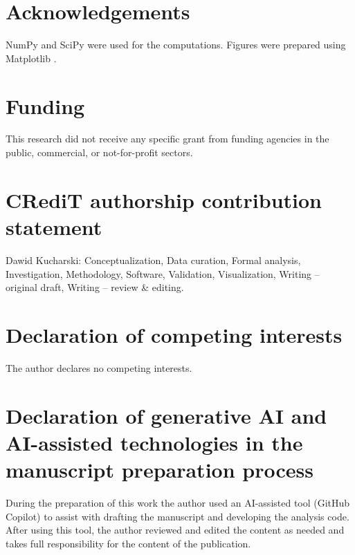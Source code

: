 \documentclass[final,1p,times,authoryear]{elsarticle}
\theoremstyle{definition}
\begin{document}
\section*{Acknowledgements}
NumPy \citep{HARRIS-2020} and SciPy \citep{VIRTANEN-2020} were used for the
computations. Figures were prepared using Matplotlib \citep{HUNTER-2007}.

\section*{Funding}
This research did not receive any specific grant from funding agencies in the
public, commercial, or not-for-profit sectors.

\section*{CRediT authorship contribution statement}
Dawid Kucharski: Conceptualization, Data curation, Formal analysis,
Investigation, Methodology, Software, Validation, Visualization, Writing --
original draft, Writing -- review \& editing.

\section*{Declaration of competing interests}
The author declares no competing interests.

\section*{Declaration of generative AI and AI-assisted technologies in the manuscript preparation process}
During the preparation of this work the author used an AI-assisted tool
(GitHub Copilot) to assist with drafting the manuscript and developing the
analysis code. After using this tool, the author reviewed and edited the
content as needed and takes full responsibility for the content of the
publication.



\end{document}
